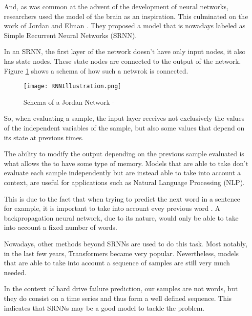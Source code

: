 And, as was common at the advent of the development of neural networks, researchers used the model of the brain as an inspiration.
This culminated on the work of Jordan \cite{jordan1986serial} and Elman \cite{elman1990finding}.
They proposed a model that is nowadays labeled as Simple Recurrent Neural Networks (SRNN).

In an SRNN, the first layer of the network doesn't have only input nodes, it also has state nodes.
These state nodes are connected to the output of the network.
Figure \ref{fig:RNNIllustration} shows a schema of how such a netwrok is connected.

\begin{figure}
    \begin{center}
        \texttt{[image: RNNIllustration.png]}
        \caption[Schema of a Jordan Network]{Schema of a Jordan Network - \cite{elman1990finding}}
        \label{fig:RNNIllustration}
    \end{center}
\end{figure}

So, when evaluating a sample, the input layer receives not exclusively the values of the independent variables of the sample, but also some values that depend on its state at previous times.

The ability to modify the output depending on the previous sample evaluated is what allows the to have some type of memory.
Models that are able to take don't evaluate each sample independently but are instead able to take into account a context, are useful for applications such as Natural Language Processing (NLP).

This is due to the fact that when trying to predict the next word in a sentence for example, it is important to take into account evey previous word \cite{tarwani2017survey}.
A backpropagation neural network, due to its nature, would only be able to take into account a fixed number of words.

Nowadays, other methods beyond SRNNs are used to do this task.
Most notably, in the last few years, Transformers\cite{vaswani2017attention} became very popular.
Nevertheless, models that are able to take into account a sequence of samples are still very much needed.

In the context of hard drive failure prediction, our samples are not words, but they do consist on a time series and thus form a well defined sequence.
This indicates that SRNNs may be a good model to tackle the problem.

